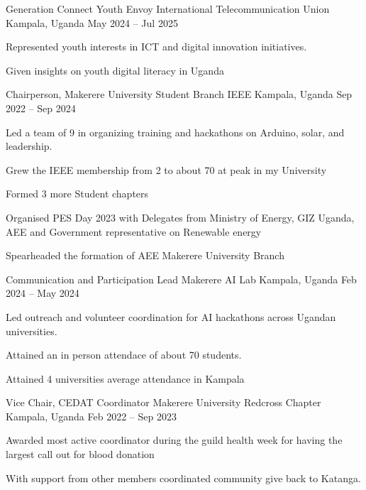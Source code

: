 
    \begin{cventries}
        
      \cventry
        {Generation Connect Youth Envoy}
        {International Telecommunication Union}
        {Kampala, Uganda}
        {May 2024 -- Jul 2025}
        {
          \begin{cvitems}
            \item Represented youth interests in ICT and digital innovation initiatives.
            \item Given insights on youth digital literacy in Uganda
          \end{cvitems}
        }
        
      \cventry
        {Chairperson, Makerere University Student Branch}
        {IEEE}
        {Kampala, Uganda}
        {Sep 2022 -- Sep 2024}
        {
          \begin{cvitems}
            \item Led a team of 9 in organizing training and hackathons on Arduino, solar, and leadership.
            \item Grew the IEEE membership from 2 to about 70 at peak in my University
            \item Formed 3 more Student chapters
            \item Organised PES Day 2023 with Delegates from Ministry of Energy, GIZ Uganda, AEE and Government representative on Renewable energy
            \item Spearheaded the formation of AEE Makerere University Branch
          \end{cvitems}
        }
    
    
      \cventry
        {Communication and Participation Lead}
        {Makerere AI Lab}
        {Kampala, Uganda}
        {Feb 2024 -- May 2024}
        {
          \begin{cvitems}
            \item Led outreach and volunteer coordination for AI hackathons across Ugandan universities.
            \item Attained an in person attendace of about 70 students.
            \item Attained 4 universities average attendance in Kampala
          \end{cvitems}
        }
        
      \cventry
        {Vice Chair, CEDAT Coordinator}
        {Makerere University Redcross Chapter}
        {Kampala, Uganda}
        {Feb 2022 -- Sep 2023}
        {
          \begin{cvitems}
            \item Awarded most active coordinator during the guild health week for having the largest call out for blood donation
            \item With support from other members coordinated community give back to Katanga.
          \end{cvitems}
        }
        
    \end{cventries}